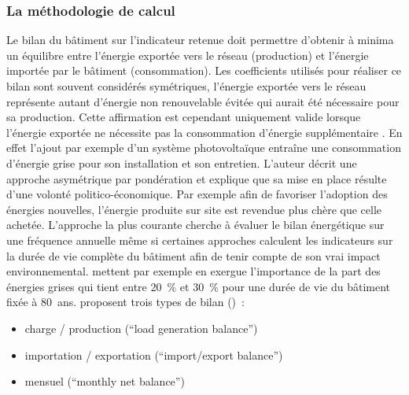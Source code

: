 \subsubsection{La méthodologie de calcul} %
\label{ssub:la_methodologie_de_calcul}
Le bilan du bâtiment sur l’indicateur retenue doit permettre d’obtenir à minima un
équilibre entre l’énergie exportée vers le réseau (production) et l’énergie importée par
le bâtiment (consommation). Les coefficients utilisés pour réaliser ce bilan sont souvent
considérés symétriques, l’énergie exportée vers le réseau représente autant d’énergie non
renouvelable évitée qui aurait été nécessaire pour sa production. Cette affirmation est
cependant uniquement valide lorsque l’énergie exportée ne nécessite pas la consommation
d’énergie supplémentaire \parencite{Sartori2012220}. En effet l’ajout par exemple d’un
système photovoltaïque entraîne une consommation d’énergie grise pour son installation et
son entretien. L’auteur décrit une approche asymétrique par pondération et explique que sa
mise en place résulte d’une volonté politico-économique. Par exemple afin de favoriser
l’adoption des énergies nouvelles, l’énergie produite sur site est revendue plus chère que
celle achetée.
L’approche la plus courante cherche à évaluer le bilan énergétique sur une fréquence annuelle
même si certaines approches calculent les indicateurs sur la durée de vie complète
du bâtiment afin de tenir compte de son vrai impact environnemental.
\textcite{Voss201146} mettent par exemple en exergue l’importance de la part des énergies grises
qui tient entre \SI{20}{\percent} et \SI{30}{\percent} pour une durée de vie du bâtiment
fixée à \SI{80}{ans}. \textcite{Sartori2012220} proposent trois types de bilan ()~:
\begin{itemize}
    \item charge / production (\enquote{load generation balance})
    \item importation / exportation (\enquote{import/export balance})
    \item mensuel (\enquote{monthly net balance})
\end{itemize}

